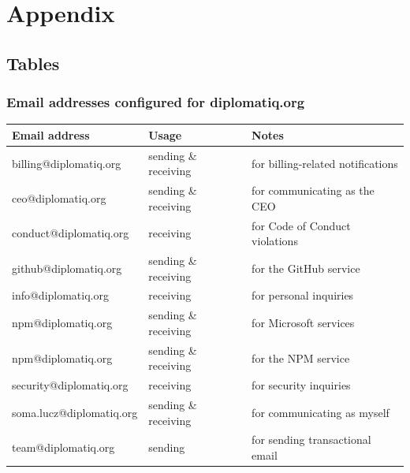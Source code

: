 \appendix
\chapter*{Appendix}
{}
\renewcommand{\thesection}{\Alph{section}}

\section{Tables}

\subsection{Email addresses configured for diplomatiq.org}

\begin{table}[!htb]
    \centering
    \begin{tabular}{l|l|l}
        \toprule
        \textbf{Email address}      & \textbf{Usage}            & \textbf{Notes} \\
        \midrule
        billing@diplomatiq.org     & sending \& receiving      & for billing-related notifications \\
        ceo@diplomatiq.org         & sending \& receiving      & for communicating as the CEO \\
        conduct@diplomatiq.org     & receiving                 & for Code of Conduct violations \\
        github@diplomatiq.org      & sending \& receiving      & for the GitHub service \\
        info@diplomatiq.org        & receiving                 & for personal inquiries \\
        npm@diplomatiq.org         & sending \& receiving      & for Microsoft services \\
        npm@diplomatiq.org         & sending \& receiving      & for the NPM service \\
        security@diplomatiq.org    & receiving                 & for security inquiries \\
        soma.lucz@diplomatiq.org   & sending \& receiving      & for communicating as myself \\
        team@diplomatiq.org        & sending                   & for sending transactional email \\
        \bottomrule
    \end{tabular}
\end{table}

